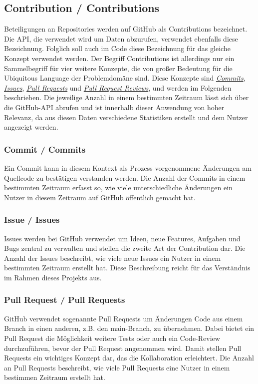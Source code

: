 \documentclass[12pt]{article}
\begin{document}
\subsection*{Contribution / Contributions}
\label{sec:Contributions}
Beteiligungen an Repositories werden auf GitHub als Contributions bezeichnet. 
Die API, die verwendet wird um Daten abzurufen, verwendet ebenfalls diese Bezeichnung. 
Folglich soll auch im Code diese Bezeichnung für das gleiche Konzept verwendet werden.
\newline
Der Begriff Contributions ist allerdings nur ein Sammelbegriff für vier weitere Konzepte, die von großer Bedeutung für die Ubiquitous Language der Problemdomäne sind.
Diese Konzepte sind \hyperref[sec:Commits]{\textit{Commits}}, \hyperref[sec:Issues]{\textit{Issues}}, \hyperref[sec:PullRequests]{\textit{Pull Requests}} und \hyperref[sec:PullRequestReviews]{\textit{Pull Request Reviews}}, und werden im Folgenden beschrieben.
Die jeweilige Anzahl in einem bestimmten Zeitraum lässt sich über die GitHub-API abrufen und ist innerhalb dieser Anwendung von hoher Relevanz, da aus diesen Daten verschiedene Statistiken erstellt und dem Nutzer angezeigt werden.
\subsubsection*{Commit / Commits}
\label{sec:Commits}
Ein Commit kann in diesem Kontext als Prozess vorgenommene Änderungen am Quellcode zu bestätigen verstanden werden.
Die Anzahl der Commits in einem bestimmten Zeitraum erfasst so, wie viele unterschiedliche Änderungen ein Nutzer in diesem Zeitraum auf GitHub öffentlich gemacht hat. 
\subsubsection*{Issue / Issues}
\label{sec:Issues}
Issues werden bei GitHub verwendet um Ideen, neue Features, Aufgaben und Bugs zentral zu verwalten und stellen die zweite Art der Contribution dar.
Die Anzahl der Issues beschreibt, wie viele neue Issues ein Nutzer in einem bestimmten Zeitraum erstellt hat.
Diese Beschreibung reicht für das Verständnis im Rahmen dieses Projekts aus.
\subsubsection*{Pull Request / Pull Requests}
\label{sec:PullRequests}
GitHub verwendet sogenannte Pull Requests um Änderungen Code aus einem Branch in einen anderen, z.B. den main-Branch, zu übernehmen.
Dabei bietet ein Pull Request die Möglichkeit weitere Tests oder auch ein Code-Review durchzuführen, bevor der Pull Request angenommen wird.
Damit stellen Pull Requests ein wichtiges Konzept dar, das die Kollaboration erleichtert.
Die Anzahl an Pull Requests beschreibt, wie viele Pull Requests eine Nutzer in einem bestimmen Zeitraum erstellt hat.
\end{document}
